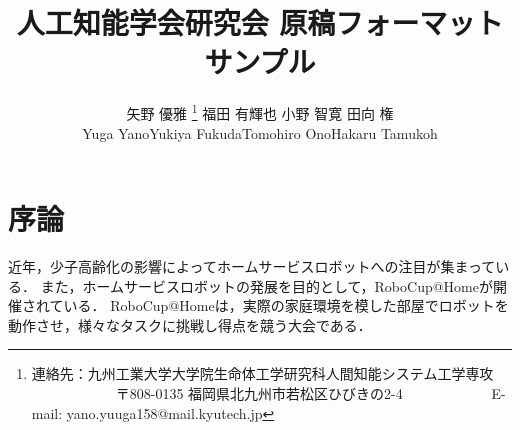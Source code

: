 \documentclass[a4j]{jarticle}
\begin{document}
\title{人工知能学会研究会 原稿フォーマットサンプル}



\author{矢野 優雅%
	\thanks{連絡先：九州工業大学大学院生命体工学研究科人間知能システム工学専攻 \newline%
		　　　　　　〒808-0135 福岡県北九州市若松区ひびきの2-4 \newline%
		　　　　　　E-mail: yano.yuuga158@mail.kyutech.jp}\quad%
	福田 有輝也
	小野 智寛
	田向 権\\
	Yuga Yano\quad \quad Yukiya Fukuda\quad \quad Tomohiro Ono\quad \quad Hakaru Tamukoh}



\maketitle
\thispagestyle{empty}


\section{序論}
近年，少子高齢化の影響によってホームサービスロボットへの注目が集まっている．
また，ホームサービスロボットの発展を目的として，RoboCup@Homeが開催されている．
RoboCup@Homeは，実際の家庭環境を模した部屋でロボットを動作させ，様々なタスクに挑戦し得点を競う大会である．

\end{document}
